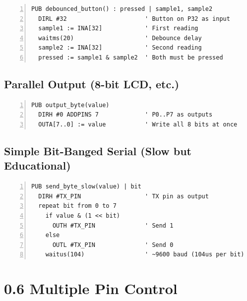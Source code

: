 \documentclass[11pt,a4paper,oneside,english]{book}
\begin{document}
\begin{Spin2Block}
\begin{Verbatim}[numbers=left,numbersep=5pt,xleftmargin=15pt]
PUB debounced_button() : pressed | sample1, sample2
  DIRL #32                      ' Button on P32 as input
  sample1 := INA[32]            ' First reading
  waitms(20)                    ' Debounce delay
  sample2 := INA[32]            ' Second reading
  pressed := sample1 & sample2  ' Both must be pressed
\end{Verbatim}
\end{Spin2Block}

\hypertarget{parallel-output-8-bit-lcd-etc.}{%
\subsection{Parallel Output (8-bit LCD,
etc.)}\label{parallel-output-8-bit-lcd-etc.}}

\begin{Spin2Block}
\begin{Verbatim}[numbers=left,numbersep=5pt,xleftmargin=15pt]
PUB output_byte(value)
  DIRH #0 ADDPINS 7             ' P0..P7 as outputs
  OUTA[7..0] := value           ' Write all 8 bits at once
\end{Verbatim}
\end{Spin2Block}

\hypertarget{simple-bit-banged-serial-slow-but-educational}{%
\subsection{Simple Bit-Banged Serial (Slow but
Educational)}\label{simple-bit-banged-serial-slow-but-educational}}

\begin{Spin2Block}
\begin{Verbatim}[numbers=left,numbersep=5pt,xleftmargin=15pt]
PUB send_byte_slow(value) | bit
  DIRH #TX_PIN                  ' TX pin as output
  repeat bit from 0 to 7
    if value & (1 << bit)
      OUTH #TX_PIN              ' Send 1
    else
      OUTL #TX_PIN              ' Send 0
    waitus(104)                 ' ~9600 baud (104us per bit)
\end{Verbatim}
\end{Spin2Block}

\hypertarget{multiple-pin-control}{%
\section{0.6 Multiple Pin Control}\label{multiple-pin-control}}
\end{document}
